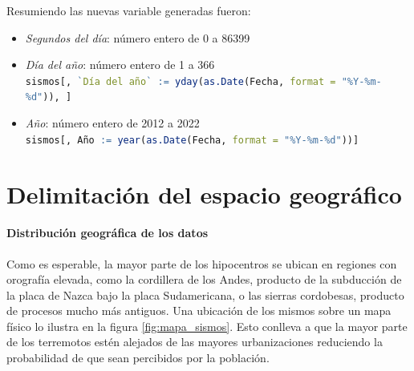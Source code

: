 \documentclass[a4paper]{report}
\begin{document}
Resumiendo las nuevas variable generadas fueron:
\begin{itemize}
	\item \emph{Segundos del día}: número entero de 0 a 86399
	\item \emph{Día del año}: número entero de 1 a 366\\
		\lstinline[language=R,breaklines=true,basicstyle=\ttfamily]'sismos[, `Día del año` := yday(as.Date(Fecha, format = "%Y-%m-%d")), ]'
	\item \emph{Año}: número entero de 2012 a 2022\\
	\lstinline[language=R,breaklines=true,basicstyle=\ttfamily]'sismos[, Año := year(as.Date(Fecha, format = "%Y-%m-%d"))]'
\end{itemize}





\section{Delimitación del espacio geográfico}\label{sec:geográfico}

\paragraph{Distribución geográfica de los datos}
Como es esperable, la mayor parte de los hipocentros se ubican en regiones con orografía elevada, como la cordillera de los Andes, producto de la subducción de la placa de Nazca bajo la placa Sudamericana, o las sierras cordobesas, producto de procesos mucho más antiguos. 
Una ubicación de los mismos sobre un mapa físico lo ilustra en la figura \ref{fig:mapa_sismos}.
Esto conlleva a que la mayor parte de los terremotos estén alejados de las mayores urbanizaciones reduciendo la probabilidad de que sean percibidos por la población.
\end{document}
